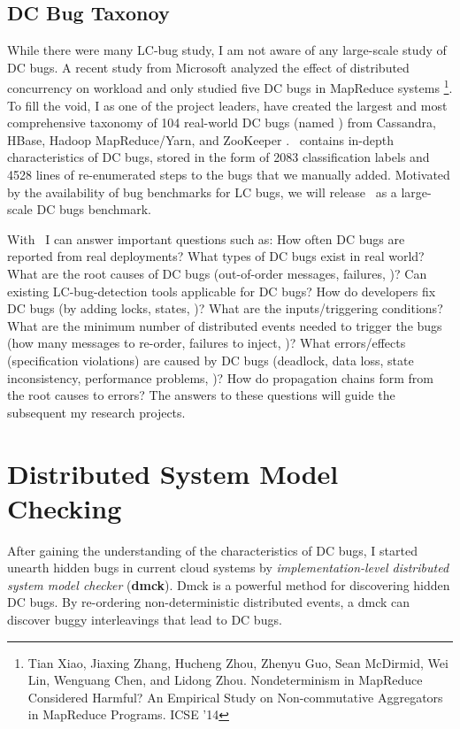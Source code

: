 \documentclass[11pt]{article}
\begin{document}
\subsection{DC Bug Taxonoy} 

While there were many LC-bug study, I am not aware of any large-scale study of
DC bugs. A recent study from Microsoft analyzed the effect of distributed
concurrency on workload and only studied five DC bugs in MapReduce systems
\footnote{Tian Xiao, Jiaxing Zhang, Hucheng Zhou, Zhenyu Guo, Sean McDirmid, Wei
Lin, Wenguang Chen, and Lidong Zhou. Nondeterminism in MapReduce Considered
Harmful?  An Empirical Study on Non-commutative Aggregators in MapReduce
Programs. ICSE '14}. To fill the void, I as one of the project leaders, have
created the largest and most comprehensive taxonomy of 104 real-world DC bugs
(named \taxdc) from Cassandra, HBase, Hadoop MapReduce/Yarn, and ZooKeeper
\cite{Gunawi+16-TaxDc-Appear}. \taxdc\ contains in-depth characteristics of DC
bugs, stored in the form of 2083 classification labels and 4528 lines of
re-enumerated steps to the bugs that we manually added. Motivated by the
availability of bug benchmarks for LC bugs, we will release \taxdc\ as a
large-scale DC bugs benchmark.

With \taxdc\, I can answer important questions such as: How often DC bugs are
reported from real deployments? What types of DC bugs exist in real world?
What are the root causes of DC bugs (out-of-order messages, failures, \etc)?
Can existing LC-bug-detection tools applicable for DC bugs? How do developers
fix DC bugs (by adding locks, states, \etc)? What are the inputs/triggering
conditions?  What are the minimum number of distributed events needed to
trigger the bugs (how many messages to re-order, failures to inject, \etc)?
What errors/effects (specification violations) are caused by DC bugs (deadlock,
data loss, state inconsistency, performance problems, \etc)? How do propagation
chains form from the root causes to errors? The answers to these questions will
guide the subsequent my research projects.

\section{Distributed System Model Checking}

After gaining the understanding of the characteristics of DC bugs, I started
unearth hidden bugs in current cloud systems by \textit{implementation-level
distributed system model checker} (\textbf{dmck}). Dmck is a powerful method for
discovering hidden DC bugs. By re-ordering non-deterministic distributed events,
a dmck can discover buggy interleavings that lead to DC bugs.
\fi
\end{document}
